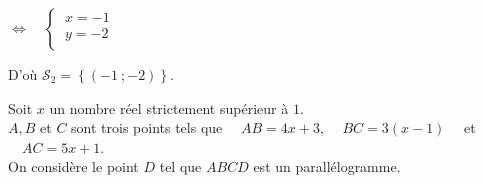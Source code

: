 \documentclass[a4paper,11pt,exos]{nsi}
\begin{document}
\begin{enumerate}
\begin{tabbing}
                \>  $\iff \quad \left\{
                    \begin{array}{l}
                    \ x=-1\\
                    \ y=-2 \\
                \end{array} \right.$\\[1em]
            \end{tabbing}
            D'où $\mathcal{S}_2=\left\{(-1\ ;-2)\right\}$.
    \end{enumerate}



\exo{}
\textcolor{UGLiBlue}{Soit $x$ un nombre réel strictement supérieur à $1$.\\
$A, B$ et $C$ sont trois points tels que $\quad AB=4x+3$, $\quad BC=3(x-1)\quad$ et $\quad AC=5x+1$.\\
On considère le point $D$ tel que $ABCD$ est un parallélogramme.}
\end{document}
